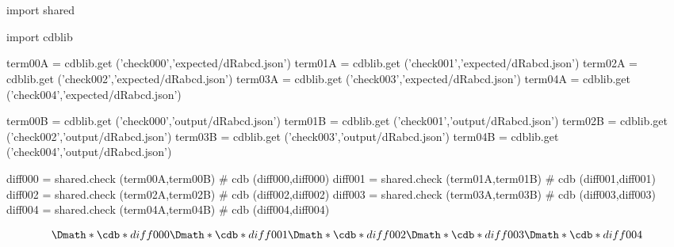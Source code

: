 \documentclass[12pt]{cdblatex}
\begin{document}
\section*{\jobname}


\begin{cadabra}
   import shared

   import cdblib

   term00A = cdblib.get ('check000','expected/dRabcd.json')
   term01A = cdblib.get ('check001','expected/dRabcd.json')
   term02A = cdblib.get ('check002','expected/dRabcd.json')
   term03A = cdblib.get ('check003','expected/dRabcd.json')
   term04A = cdblib.get ('check004','expected/dRabcd.json')

   term00B = cdblib.get ('check000','output/dRabcd.json')
   term01B = cdblib.get ('check001','output/dRabcd.json')
   term02B = cdblib.get ('check002','output/dRabcd.json')
   term03B = cdblib.get ('check003','output/dRabcd.json')
   term04B = cdblib.get ('check004','output/dRabcd.json')

   diff000 = shared.check (term00A,term00B)   # cdb (diff000,diff000)
   diff001 = shared.check (term01A,term01B)   # cdb (diff001,diff001)
   diff002 = shared.check (term02A,term02B)   # cdb (diff002,diff002)
   diff003 = shared.check (term03A,term03B)   # cdb (diff003,diff003)
   diff004 = shared.check (term04A,term04B)   # cdb (diff004,diff004)

\end{cadabra}

\begin{dgroup*}
   \Dmath*{ \cdb*{diff000} }
   \Dmath*{ \cdb*{diff001} }
   \Dmath*{ \cdb*{diff002} }
   \Dmath*{ \cdb*{diff003} }
   \Dmath*{ \cdb*{diff004} }
\end{dgroup*}
\end{document}
